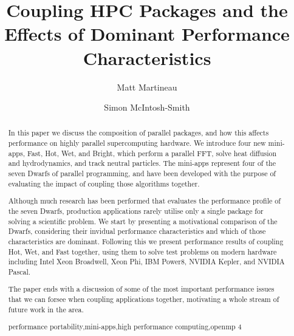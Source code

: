 \documentclass[runningheads,a4paper]{llncs}
\newcommand{\keywords}[1]{\par\addvspace\baselineskip
\noindent\keywordname\enspace\ignorespaces#1}
\begin{document}
\mainmatter  %

\title{Coupling HPC Packages and the Effects of Dominant Performance Characteristics}


\author{Matt Martineau \and Simon McIntosh-Smith}
%


%
%

\maketitle


\begin{abstract}
  In this paper we discuss the composition of parallel packages, and how this affects performance on highly parallel supercomputing hardware. We introduce four new mini-apps, Fast, Hot, Wet, and Bright, which perform a parallel FFT, solve heat diffusion and hydrodynamics, and track neutral particles. The mini-apps represent four of the seven Dwarfs of parallel programming, and have been developed with the purpose of evaluating the impact of coupling those algorithms together.

  Although much research has been performed that evaluates the performance profile of the seven Dwarfs, production applications rarely utilise only a single package for solving a scientific problem. We start by presenting a motivational comparison of the Dwarfs, considering their invidual performance characteristics and which of those characteristics are dominant. Following this we present performance results of coupling Hot, Wet, and Fast together, using them to solve test problems on modern hardware including Intel Xeon Broadwell, Xeon Phi, IBM Power8, NVIDIA Kepler, and NVIDIA Pascal.

  The paper ends with a discussion of some of the most important performance issues that we can forsee when coupling applications together, motivating a whole stream of future work in the area.

  \keywords{performance portability,mini-apps,high performance computing,openmp 4}
\end{abstract}
\end{document}

